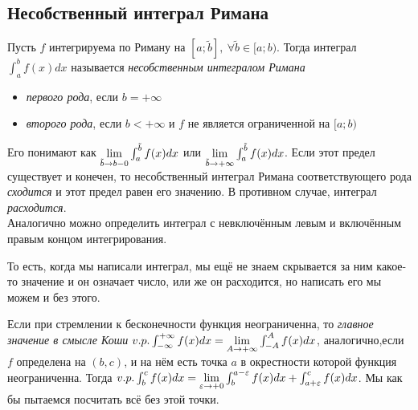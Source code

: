 \subsection{Несобственный интеграл Римана}

\begin{definition}
	Пусть $f$ интегрируема по Риману на $[a; \tilde{b}],\ \forall \tilde{b} \in [a; b)$. Тогда интеграл $\int_a^b f(x)dx$ называется \textit{несобственным интегралом Римана}
	\begin{itemize}
		\item \textit{первого рода}, если $b = +\infty$
		
		\item \textit{второго рода}, если $b < +\infty$ и $f$ не является ограниченной на $[a; b)$
	\end{itemize}
	Его понимают как $\lim\limits_{\tilde{b} \to b-0} \int_a^{\tilde{b}} f(x)dx$ или $\lim\limits_{\tilde{b} \to +\infty} \int_a^{\tilde{b}} f(x)dx$. Если этот предел существует и конечен, то несобственный интеграл Римана соответствующего рода \textit{сходится} и этот предел равен его значению. В противном случае, интеграл \textit{расходится}.
	\\
	Аналогично можно определить интеграл с невключённым левым и включённым правым концом интегрирования.
\end{definition}

\begin{anote}
	То есть, когда мы написали интеграл, мы ещё не знаем скрывается за ним какое-то значение и он  означает число, или же он расходится, но написать его мы можем и без этого.
\end{anote}

\begin{definition}
	Если при стремлении к бесконечности функция неограниченна, то \textit{главное значение в смысле Коши} $v.p.\int_{-\infty}^{+\infty} f(x)dx = \lim\limits_{A\to+\infty}\int_{-A}^A f(x)dx$, аналогично,если $f$ определена на  $(b,c)$, и на нём есть точка $a$ в окрестности которой функция неограниченна. Тогда $v.p.\int_{b}^{c} f(x)dx = \lim\limits_{\varepsilon\to+0}\int_{b}^{a-\varepsilon} f(x)dx + \int_{a + \varepsilon}^{c} f(x)dx$. Мы как бы пытаемся посчитать всё без этой точки.
\end{definition}